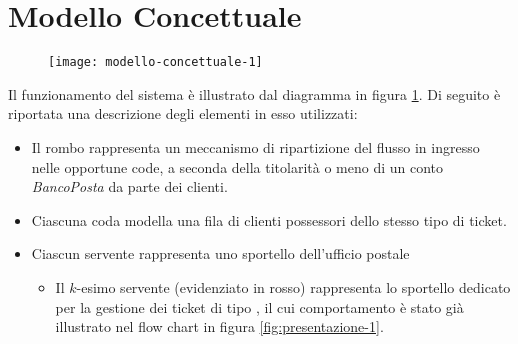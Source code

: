 \section{Modello Concettuale}\label{sec:modello-concettuale}
\begin{figure}[ht]
\centering
\texttt{[image: modello-concettuale-1]}
\label{fig:modello-concettuale-1}
\end{figure}

Il funzionamento del sistema è illustrato dal diagramma in figura \ref{fig:modello-concettuale-1}. Di seguito è riportata una descrizione degli elementi in esso utilizzati:
\begin{itemize}
\item Il rombo rappresenta un meccanismo di ripartizione del flusso in ingresso nelle opportune code, a seconda della titolarità o meno di un conto \textsl{BancoPosta} da parte dei clienti.
\item Ciascuna coda modella una fila di clienti possessori dello stesso tipo di ticket.
\item Ciascun servente rappresenta uno sportello dell'ufficio postale
\begin{itemize}
\item Il $k$-esimo servente (evidenziato in {\color{red} rosso}) rappresenta lo sportello dedicato per la gestione dei ticket di tipo \sr{}, il cui comportamento è stato già illustrato nel flow chart in figura \ref{fig:presentazione-1}.
\end{itemize}
\end{itemize}

